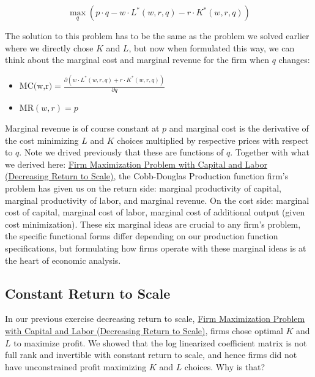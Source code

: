 \documentclass[
]{book}
\begin{document}
\[\max_q \left(p\cdot q-w\cdot L^* (w,r,q)-r\cdot K^* (w,r,q)\right)\]

The solution to this problem has to be the same as the problem we solved
earlier where we directly chose \(K\) and \(L\), but now when formulated
this way, we can think about the marginal cost and marginal revenue for
the firm when \(q\) changes:

\begin{itemize}
\item
  \(\displaystyle \textrm{MC(w,r)}=\frac{\partial (w\cdot L^* (w,r,q)+r\cdot K^* (w,r,q))}{\partial q}\)
\item
  \(\displaystyle \textrm{MR}(w,r)=p\)
\end{itemize}

Marginal revenue is of course constant at \(p\) and marginal cost is the
derivative of the cost minimizing \(L\) and \(K\) choices multiplied by
respective prices with respect to \(q\). Note we drived previously that
these are functions of \(q\). Together with what we derived here: \href{https://fanwangecon.github.io/Math4Econ/matrix_application/KL_borrowhire_firm.html}{Firm
Maximization Problem with Capital and Labor (Decreasing Return to
Scale)},
the Cobb-Douglas Production function firm's problem has given us on the
return side: marginal productivity of capital, marginal productivity of
labor, and marginal revenue. On the cost side: marginal cost of capital,
marginal cost of labor, marginal cost of additional output (given cost
minimization). These six marginal ideas are crucial to any firm's
problem, the specific functional forms differ depending on our
production function specifications, but formulating how firms operate
with these marginal ideas is at the heart of economic analysis.

\hypertarget{constant-return-to-scale}{%
\subsection{Constant Return to Scale}\label{constant-return-to-scale}}

In our previous exercise decreasing return to scale, \href{https://fanwangecon.github.io/Math4Econ/matrix_application/KL_borrowhire_firm.html}{Firm Maximization
Problem with Capital and Labor (Decreasing Return to
Scale)},
firms chose optimal \(K\) and \(L\) to maximize profit. We showed that the
log linearized coefficient matrix is not full rank and invertible with
constant return to scale, and hence firms did not have unconstrained
profit maximizing \(K\) and \(L\) choices. Why is that?
\end{document}
